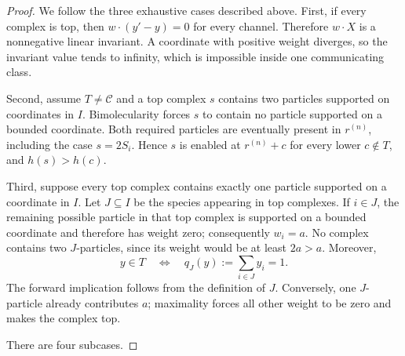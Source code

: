\begin{proof}
We follow the three exhaustive cases described above.  First, if every
complex is top, then \(w\cdot(y'-y)=0\) for every channel.
Therefore \(w\cdot X\) is a nonnegative linear invariant.  A coordinate with
positive weight diverges, so the invariant value tends to infinity, which is
impossible inside one communicating class.

Second, assume \(T\ne\mathcal C\) and a top complex \(s\) contains two
particles supported on coordinates in \(I\).  Bimolecularity forces \(s\) to
contain no particle supported on a bounded coordinate.  Both required
particles are eventually present in \(r^{(n)}\), including the case
\(s=2S_i\).  Hence \(s\) is enabled at \(r^{(n)}+c\) for every lower
\(c\notin T\), and \(h(s)>h(c)\).

Third, suppose every top complex contains exactly one particle supported on a
coordinate in \(I\).  Let \(J\subseteq I\) be the species appearing in top
complexes.  If \(i\in J\), the remaining possible particle in that top
complex is supported on a bounded coordinate and therefore has weight zero;
consequently \(w_i=a\).  No complex contains two \(J\)-particles, since its
weight would be at least \(2a>a\).  Moreover,
\begin{equation}\label{eq:top-iff}
  y\in T\quad\Longleftrightarrow\quad
  q_J(y):=\sum_{i\in J}y_i=1.
\end{equation}
The forward implication follows from the definition of \(J\).  Conversely,
one \(J\)-particle already contributes \(a\); maximality forces all other
weight to be zero and makes the complex top.

There are four subcases.


\end{proof}
